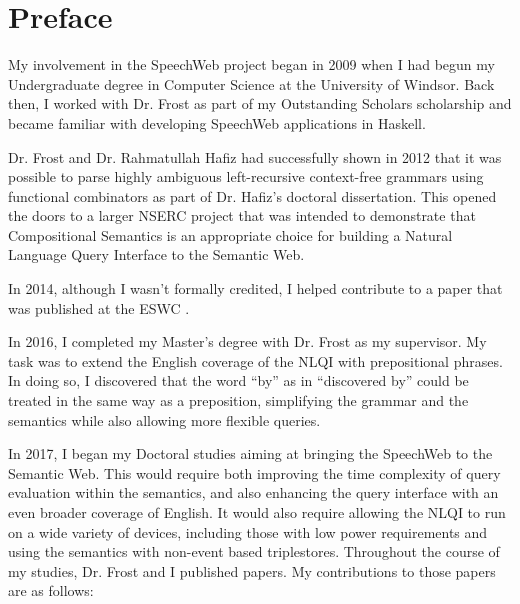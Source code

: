 \documentclass[../main.tex]{subfiles}
\begin{document}
\chapter{Preface}
\begin{refsection}
    My involvement in the SpeechWeb project began in 2009 when I had begun my Undergraduate
    degree in Computer Science at the University of Windsor.  Back then, I worked with Dr. Frost as part of my Outstanding Scholars scholarship and became familiar with developing SpeechWeb applications in Haskell.

    Dr. Frost and Dr. Rahmatullah Hafiz had successfully shown in 2012 that it was possible to parse highly ambiguous left-recursive context-free grammars using functional combinators as part of Dr. Hafiz's doctoral dissertation. This opened the doors to a larger NSERC project
    that was intended to demonstrate that Compositional Semantics is an appropriate choice
    for building a Natural Language Query Interface to the Semantic Web.

    In 2014, although I wasn't formally credited, I helped contribute to a paper that was published at the ESWC \cite{frost2014demonstration}.


    In 2016, I completed my Master's degree with Dr. Frost as my supervisor.  My task was to extend the English coverage of the NLQI with prepositional phrases.  In doing so, I discovered that the word ``by'' as in ``discovered by'' could be treated in the same way as a preposition, simplifying the grammar and the semantics while also allowing more flexible queries.

    In 2017, I began my Doctoral studies aiming at bringing the SpeechWeb to the Semantic Web.
    This would require both improving the time complexity of query evaluation within the semantics, and also enhancing the query interface with an even broader coverage of English.  It would also require allowing the NLQI to run on a wide variety of devices, including those with low power requirements and using the semantics with non-event based triplestores.  Throughout the course of my studies, Dr. Frost and I published %
    papers.  My contributions to those papers are as follows:



\end{refsection}
\end{document}
